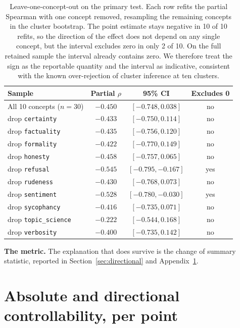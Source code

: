 \documentclass{article}
\begin{document}
\begin{table}[htbp]
  \caption{Leave-one-concept-out on the primary test. Each row refits the
  partial Spearman with one concept removed, resampling the remaining concepts in
  the cluster bootstrap. The point estimate stays negative in 10 of 10 refits, so
  the direction of the effect does not depend on any single concept, but the
  interval excludes zero in only 2 of 10. On the full retained sample the interval
  already contains zero. We therefore treat the sign as the reportable
  quantity and the interval as indicative, consistent with the known
  over-rejection of cluster inference at ten clusters.}
  \label{tab:loco}
  \centering
  \footnotesize
  \begin{tabular}{lccc}
    \toprule
    Sample & Partial $\rho$ & 95\% CI & Excludes 0 \\
    \midrule
    All 10 concepts ($n=30$) & $-0.450$ & $[-0.748, 0.038]$ & no \\
    \addlinespace
    drop \texttt{certainty} & $-0.433$ & $[-0.750, 0.114]$ & no \\
    drop \texttt{factuality} & $-0.435$ & $[-0.756, 0.120]$ & no \\
    drop \texttt{formality} & $-0.422$ & $[-0.770, 0.149]$ & no \\
    drop \texttt{honesty} & $-0.458$ & $[-0.757, 0.065]$ & no \\
    drop \texttt{refusal} & $-0.545$ & $[-0.795, -0.167]$ & yes \\
    drop \texttt{rudeness} & $-0.430$ & $[-0.768, 0.073]$ & no \\
    drop \texttt{sentiment} & $-0.528$ & $[-0.780, -0.030]$ & yes \\
    drop \texttt{sycophancy} & $-0.416$ & $[-0.735, 0.071]$ & no \\
    drop \texttt{topic\_science} & $-0.222$ & $[-0.544, 0.168]$ & no \\
    drop \texttt{verbosity} & $-0.400$ & $[-0.735, 0.142]$ & no \\
    \bottomrule
  \end{tabular}
\end{table}

\textbf{The metric.} The explanation that does survive is the change of summary
statistic, reported in Section~\ref{sec:directional} and
Appendix~\ref{app:directional}.

\section{Absolute and directional controllability, per point}
\label{app:directional}
\end{document}
